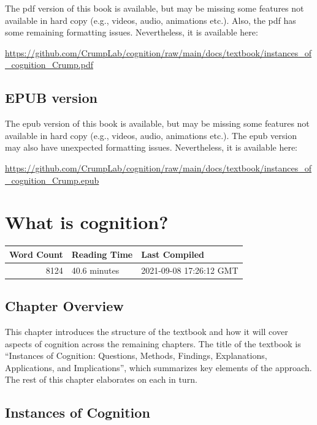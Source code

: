 \documentclass[
  oneside,
  12pt]{crumpbook}
\begin{document}
The pdf version of this book is available, but may be missing some features not available in hard copy (e.g., videos, audio, animations etc.). Also, the pdf has some remaining formatting issues. Nevertheless, it is available here:

\url{https://github.com/CrumpLab/cognition/raw/main/docs/textbook/instances_of_cognition_Crump.pdf}

\hypertarget{epub-version}{%
\section{EPUB version}\label{epub-version}}

The epub version of this book is available, but may be missing some features not available in hard copy (e.g., videos, audio, animations etc.). The epub version may also have unexpected formatting issues. Nevertheless, it is available here:

\url{https://github.com/CrumpLab/cognition/raw/main/docs/textbook/instances_of_cognition_Crump.epub}

\hypertarget{what-is-cognition}{%
\chapter{What is cognition?}\label{what-is-cognition}}

\begin{tabular}{r|l|l}
\hline
Word Count & Reading Time & Last Compiled\\
\hline
8124 & 40.6 minutes & 2021-09-08 17:26:12 GMT\\
\hline
\end{tabular}

\hypertarget{chapter-overview}{%
\section{Chapter Overview}\label{chapter-overview}}

This chapter introduces the structure of the textbook and how it will cover aspects of cognition across the remaining chapters. The title of the textbook is ``Instances of Cognition: Questions, Methods, Findings, Explanations, Applications, and Implications'', which summarizes key elements of the approach. The rest of this chapter elaborates on each in turn.

\hypertarget{instances-of-cognition}{%
\section{Instances of Cognition}\label{instances-of-cognition}}
\end{document}
